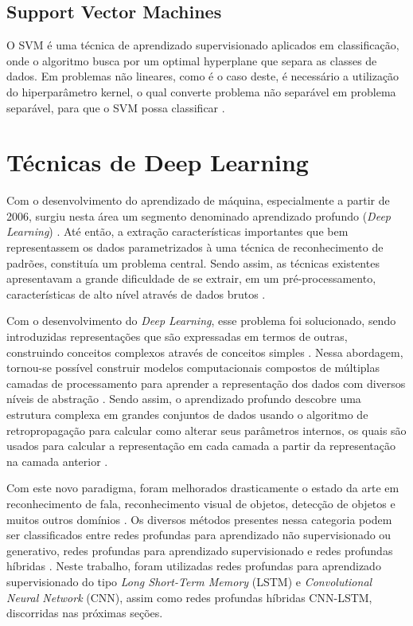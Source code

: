 \subsection{Support Vector Machines}

O SVM é uma técnica de aprendizado supervisionado aplicados em classificação, onde o algoritmo busca por um optimal hyperplane que separa as classes de dados. Em problemas não lineares, como é o caso deste, é necessário a utilização do hiperparâmetro kernel, o qual converte problema não separável em problema separável, para que o SVM possa classificar \cite{Shubham2018}.

\section{Técnicas de Deep Learning}

Com o desenvolvimento do aprendizado de máquina, especialmente a partir de 2006, surgiu nesta área um segmento denominado aprendizado profundo (\textit{Deep Learning}) \cite{Deng2014}. Até então, a extração características importantes que bem representassem os dados parametrizados à uma técnica de reconhecimento de padrões, constituía um problema central. Sendo assim, as técnicas existentes apresentavam a grande dificuldade de se extrair, em um pré-processamento, características de alto nível através de dados brutos \cite{Goodfellow2016}. 

Com o desenvolvimento do \textit{Deep Learning}, esse problema foi solucionado, sendo introduzidas representações que são expressadas em termos de outras, construindo conceitos complexos através de conceitos simples \cite{Goodfellow2016}. Nessa abordagem, tornou-se possível construir modelos computacionais compostos de múltiplas camadas de processamento para aprender a representação dos dados com diversos níveis de abstração \cite{LeCun2015}. Sendo assim, o aprendizado profundo descobre uma estrutura complexa em grandes conjuntos de dados usando o algoritmo de retropropagação para calcular como alterar seus parâmetros internos, os quais são usados para calcular a representação em cada camada a partir da representação na camada anterior \cite{LeCun2015}.

Com este novo paradigma, foram melhorados drasticamente o estado da arte em reconhecimento de fala, reconhecimento visual de objetos, detecção de objetos e muitos outros domínios \cite{LeCun2015}. Os diversos métodos presentes nessa categoria podem ser classificados entre redes profundas para aprendizado não supervisionado ou generativo, redes profundas para aprendizado supervisionado e redes profundas híbridas \cite{Deng2014}. Neste trabalho, foram utilizadas redes  profundas para aprendizado supervisionado do tipo \textit{Long Short-Term Memory} (LSTM) e \textit{Convolutional Neural Network} (CNN), assim como redes profundas híbridas CNN-LSTM, discorridas nas próximas seções.

